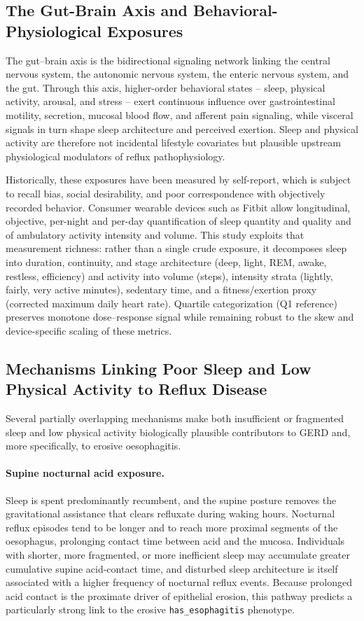 \documentclass[11pt]{article}
\newcommand{\code}[1]{\texttt{\small #1}}
\begin{document}
\subsection{The Gut-Brain Axis and Behavioral-Physiological Exposures}

The gut--brain axis is the bidirectional signaling network linking the central nervous system, the autonomic nervous system, the enteric nervous system, and the gut. Through this axis, higher-order behavioral states -- sleep, physical activity, arousal, and stress -- exert continuous influence over gastrointestinal motility, secretion, mucosal blood flow, and afferent pain signaling, while visceral signals in turn shape sleep architecture and perceived exertion. Sleep and physical activity are therefore not incidental lifestyle covariates but plausible upstream physiological modulators of reflux pathophysiology.

Historically, these exposures have been measured by self-report, which is subject to recall bias, social desirability, and poor correspondence with objectively recorded behavior. Consumer wearable devices such as Fitbit allow longitudinal, objective, per-night and per-day quantification of sleep quantity and quality and of ambulatory activity intensity and volume. This study exploits that measurement richness: rather than a single crude exposure, it decomposes sleep into duration, continuity, and stage architecture (deep, light, REM, awake, restless, efficiency) and activity into volume (steps), intensity strata (lightly, fairly, very active minutes), sedentary time, and a fitness/exertion proxy (corrected maximum daily heart rate). Quartile categorization (Q1 reference) preserves monotone dose--response signal while remaining robust to the skew and device-specific scaling of these metrics.

\subsection{Mechanisms Linking Poor Sleep and Low Physical Activity to Reflux Disease}

Several partially overlapping mechanisms make both insufficient or fragmented sleep and low physical activity biologically plausible contributors to GERD and, more specifically, to erosive oesophagitis.

\paragraph{Supine nocturnal acid exposure.} Sleep is spent predominantly recumbent, and the supine posture removes the gravitational assistance that clears refluxate during waking hours. Nocturnal reflux episodes tend to be longer and to reach more proximal segments of the oesophagus, prolonging contact time between acid and the mucosa. Individuals with shorter, more fragmented, or more inefficient sleep may accumulate greater cumulative supine acid-contact time, and disturbed sleep architecture is itself associated with a higher frequency of nocturnal reflux events. Because prolonged acid contact is the proximate driver of epithelial erosion, this pathway predicts a particularly strong link to the erosive \code{has_esophagitis} phenotype.
\end{document}

